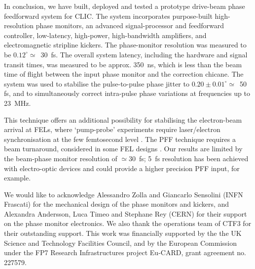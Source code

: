\documentclass[%
 reprint,
 superscriptaddress,
 amsmath,
 amssymb,
 prl,
]{revtex4-1}
\begin{document}

In conclusion, we have built, deployed and tested a prototype drive-beam phase 
feedforward system for CLIC.   The system incorporates purpose-built 
high-resolution phase 
monitors, an advanced signal-processor and feedforward controller, low-latency, 
high-power, high-bandwidth amplifiers, and electromagnetic stripline
kickers. The phase-monitor resolution was measured to be 
\(0.12^\circ\simeq\)~30~fs.  The overall system latency, including the hardware 
and signal transit times, was measured to be approx. 350~ns, which is less than 
the beam time of flight between the input phase monitor and the correction 
chicane.
The system was used to 
stabilise the pulse-to-pulse phase jitter to \(0.20\pm0.01^\circ\simeq\)~50 fs, 
and to simultaneously correct intra-pulse phase variations at frequencies up to 
23~MHz.

This technique offers an additional possibility for stabilising the 
electron-beam arrival at FELs, where `pump-probe' 
experiments require laser/electron synchronisation at the few femtosecond level 
\cite{Savelyev2017}. The PFF technique requires a beam turnaround, considered 
in some FEL designs \cite{Sekutowicz2005,Kwang2008,Jackson2016}. Our results 
are limited by the beam-phase monitor 
resolution of \(\simeq 30\)~fs; 5~fs resolution has been achieved with 
electro-optic devices \cite{flashPRL} and could provide a higher precision PFF 
input, for example.

\begin{acknowledgments}
	We would like to acknowledge Alessandro Zolla and Giancarlo Sensolini (INFN 
	Frascati) for the mechanical design of the phase monitors and 
	kickers, and Alexandra Andersson, Luca Timeo and Stephane Rey (CERN) for 
	their support on the phase monitor electronics. We also thank the 
	operations team of CTF3 for their outstanding support. This work was 
	financially supported by the the UK Science and Technology Facilities 
	Council, and by the European Commission under the FP7 Research 
	Infrastructures project Eu-CARD, grant agreement no. 227579.
\end{acknowledgments}


\end{document}
